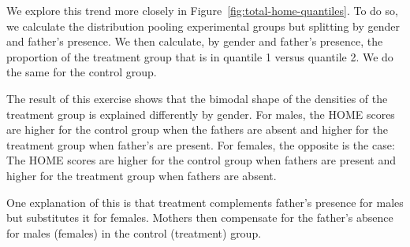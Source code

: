 We explore this trend more closely in Figure~\ref{fig:total-home-quantiles}. To do so, we calculate the distribution pooling experimental groups but splitting by gender and father's presence. We then calculate, by gender and father's presence, the proportion of the treatment group that is in quantile 1 versus quantile 2. We do the same for the control group. 

The result of this exercise shows that the bimodal shape of the densities of the treatment group is explained differently by gender. For males, the HOME scores are higher for the control group when the fathers are absent and higher for the treatment group when father's are present. For females, the opposite is the case: The HOME scores are higher for the control group when fathers are present and higher for the treatment group when fathers are absent. 

One explanation of this is that treatment complements father's presence for males but substitutes it for females. Mothers then compensate for the father's absence for males (females) in the control (treatment) group. 


